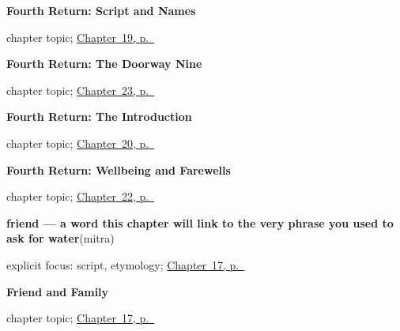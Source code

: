 \noindent\begin{minipage}[t]{\linewidth}
\raggedright
\textbf{Fourth Return: Script and Names}\par
\footnotesize chapter topic; \hyperref[ch:gu-r4-script-names]{Chapter~19, p.~\pageref*{ch:gu-r4-script-names}}
\end{minipage}\par\smallskip

\noindent\begin{minipage}[t]{\linewidth}
\raggedright
\textbf{Fourth Return: The Doorway Nine}\par
\footnotesize chapter topic; \hyperref[ch:gu-doorway-r4]{Chapter~23, p.~\pageref*{ch:gu-doorway-r4}}
\end{minipage}\par\smallskip

\noindent\begin{minipage}[t]{\linewidth}
\raggedright
\textbf{Fourth Return: The Introduction}\par
\footnotesize chapter topic; \hyperref[ch:gu-r4-introduction]{Chapter~20, p.~\pageref*{ch:gu-r4-introduction}}
\end{minipage}\par\smallskip

\noindent\begin{minipage}[t]{\linewidth}
\raggedright
\textbf{Fourth Return: Wellbeing and Farewells}\par
\footnotesize chapter topic; \hyperref[ch:gu-r4-wellbeing-farewells]{Chapter~22, p.~\pageref*{ch:gu-r4-wellbeing-farewells}}
\end{minipage}\par\smallskip

\noindent\begin{minipage}[t]{\linewidth}
\raggedright
\textbf{friend — a word this chapter will link to the very phrase you used to ask for water}\enspace\emph{}\enspace(mitra)\par
\footnotesize explicit focus: script, etymology; \hyperref[ch:gu-friend-and-family]{Chapter~17, p.~\pageref*{ch:gu-friend-and-family}}
\end{minipage}\par\smallskip

\noindent\begin{minipage}[t]{\linewidth}
\raggedright
\textbf{Friend and Family}\par
\footnotesize chapter topic; \hyperref[ch:gu-friend-and-family]{Chapter~17, p.~\pageref*{ch:gu-friend-and-family}}
\end{minipage}\par\smallskip

